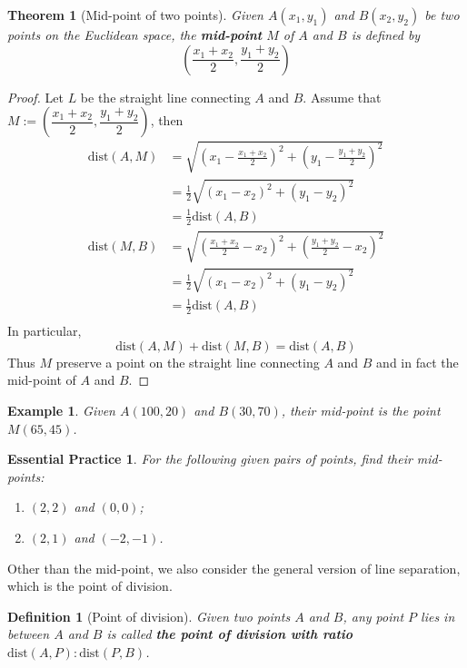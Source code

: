 \documentclass[12pt]{article}
\newtheorem{definition}{Definition}[section]
\newtheorem*{theorem}{Theorem}
\newtheorem*{example}{Example}
\newtheorem{exercise}{Essential Practice}[subsection]
\begin{document}
    \begin{theorem}[Mid-point of two points]
        Given $A(x_1,y_1)$ and $B(x_2,y_2)$ be two points on the Euclidean space, the \textbf{mid-point} $M$ of $A$ and $B$ is defined by $$(\frac{x_1+x_2}{2},\frac{y_1+y_2}{2})$$
    \end{theorem}

    \begin{proof}
        Let $L$ be the straight line connecting $A$ and $B$. Assume that $M:=(\dfrac{x_1+x_2}{2},\dfrac{y_1+y_2}{2})$, then\begin{align*}
            \mathrm{dist}(A,M)&=\sqrt{(x_1-\frac{x_1+x_2}{2})^2+(y_1-\frac{y_1+y_2}{2})^2}\\
            &=\frac{1}{2}\sqrt{(x_1-x_2)^2+(y_1-y_2)^2}\\
            &=\frac{1}{2}\mathrm{dist}(A,B)\\
            \mathrm{dist}(M,B)&=\sqrt{(\frac{x_1+x_2}{2}-x_2)^2+(\frac{y_1+y_2}{2}-x_2)^2}\\
            &=\frac{1}{2}\sqrt{(x_1-x_2)^2+(y_1-y_2)^2}\\
            &=\frac{1}{2}\mathrm{dist}(A,B)\\
        \end{align*}
        In particular, $$\mathrm{dist}(A,M)+\mathrm{dist}(M,B)=\mathrm{dist}(A,B)$$
        Thus $M$ preserve a point on the straight line connecting $A$ and $B$ and in fact the mid-point of $A$ and $B$.
    \end{proof}

    \begin{example}
        Given $A(100,20)$ and $B(30,70)$, their mid-point is the point $M(65,45)$.
    \end{example}

    \begin{exercise}
        For the following given pairs of points, find their mid-points:\begin{enumerate}
            \item $(2,2)$ and $(0,0)$;
            \item $(2,1)$ and $(-2,-1)$.
        \end{enumerate}
    \end{exercise}

    Other than the mid-point, we also consider the general version of line separation, which is the point of division.

    \begin{definition}[Point of division]
        Given two points $A$ and $B$, any point $P$ lies in between $A$ and $B$ is called \textbf{the point of division with ratio $\mathrm{dist}(A,P):\mathrm{dist}(P,B)$}.
    \end{definition}
\end{document}
